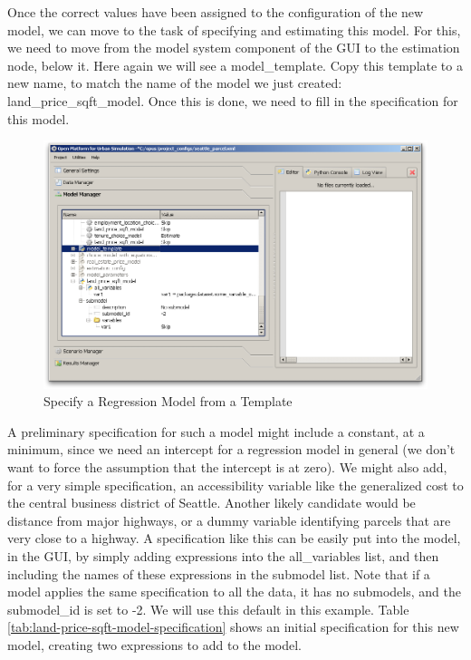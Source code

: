 Once the correct values have been assigned to the configuration of the new model, we can move to the task of specifying and estimating this model.  For this, we need to move from the model system component of the GUI to the estimation node, below it.  Here again we will see a model\_template.  Copy this template to a new name, to match the name of the model we just created: land\_price\_sqft\_model.  Once this is done, we need to fill in the specification for this model.

\begin{figure}[htp]
\begin{center}
\includegraphics[scale=0.4]{graphics/specify-regression-template.png}
\end{center}
\caption{Specify a Regression Model from a Template}
\label{fig:model-regression-2}
\end{figure}

A preliminary specification for such a model might include a constant, at a minimum, since we need an intercept for a regression model in general (we don't want to force the assumption that the intercept is at zero).  We might also add, for a very simple specification, an accessibility variable like the generalized cost to the central business district of Seattle.  Another likely candidate would be distance from major highways, or a dummy variable identifying parcels that are very close to a highway.  A specification like this can be easily put into the model, in the GUI, by simply adding expressions into the all\_variables list, and then including the names of these expressions in the submodel list.  Note that if a model applies the same specification to all the data, it has no submodels, and the submodel\_id is set to -2.  We will use this default in this example.  Table \ref{tab:land-price-sqft-model-specification} shows an initial specification for this new model, creating two expressions to add to the model.



